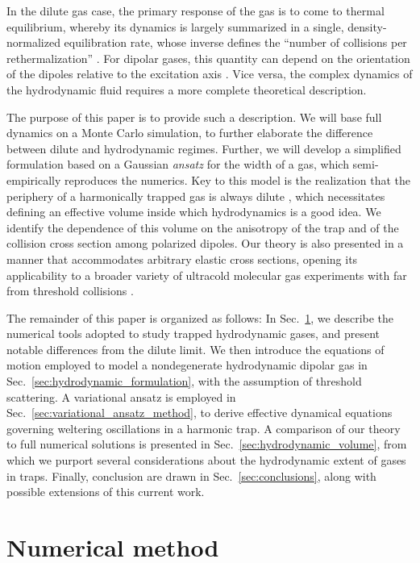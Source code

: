 \documentclass[reprint, amsmath, amssymb, aps, superscriptaddress]{revtex4-1}
\begin{document}
In the dilute gas case, the primary response of the gas is to come to thermal equilibrium, whereby its dynamics is largely summarized in a single, density-normalized equilibration rate, whose inverse defines the ``number of collisions per rethermalization'' \cite{Monroe93_PRL}. For dipolar gases, this quantity can depend on the orientation of the dipoles relative to the excitation axis \cite{Bohn14_PRA, Wang21_PRA}. Vice versa, the complex dynamics of the hydrodynamic fluid requires a more complete theoretical description.

The purpose of this paper is to provide such a description.  We will base full dynamics on a Monte Carlo simulation, to further elaborate the difference between dilute and hydrodynamic regimes.  Further, we will develop a simplified formulation based on a Gaussian {\it ansatz} for the width of a gas, which semi-empirically reproduces the numerics.  Key to this model is the realization that the periphery of a harmonically trapped gas is always dilute \cite{Schafer14_PRA, Bluhm15_PRA}, which necessitates defining an effective volume inside which hydrodynamics is a good idea.  We identify the dependence of this volume on the anisotropy of the trap and of the collision cross section among polarized dipoles. 
Our theory is also presented in a manner that accommodates arbitrary elastic cross sections, 
opening its applicability to a broader variety of ultracold molecular gas experiments with far from threshold collisions \cite{Sadeghpour00_JPB}.

The remainder of this paper is organized as follows: 
In Sec.~\ref{sec:numerical_studies}, we describe the numerical tools adopted to study trapped hydrodynamic gases, and present notable differences from the dilute limit.
We then introduce the equations of motion employed to model a nondegenerate hydrodynamic dipolar gas in Sec.~\ref{sec:hydrodynamic_formulation}, with the assumption of threshold scattering. A variational ansatz is employed in Sec.~\ref{sec:variational_ansatz_method}, to derive effective dynamical equations governing weltering oscillations in a harmonic trap. 
A comparison of our theory to full numerical solutions is presented in Sec.~\ref{sec:hydrodynamic_volume}, from which we purport several considerations about the hydrodynamic extent of gases in traps. 
Finally, conclusion are drawn in Sec.~\ref{sec:conclusions}, along with possible extensions of this current work.



\section{ Numerical method } \label{sec:numerical_studies} 
\end{document}
